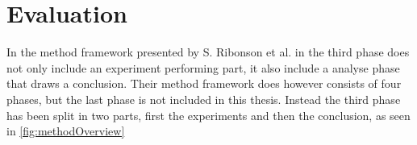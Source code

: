 \section{Evaluation}\label{sec:methodEvaluation}
In the method framework presented by S. Ribonson et al. in \cite{SecretsSuccessfulSimulation1995} the third phase does not only include an experiment performing part, it also include a analyse phase that draws a conclusion.
Their method framework does however consists of four phases, but the last phase is not included in this thesis.
Instead the third phase has been split in two parts, first the experiments and then the conclusion, as seen in \cref{fig:methodOverview}

\bigskip

